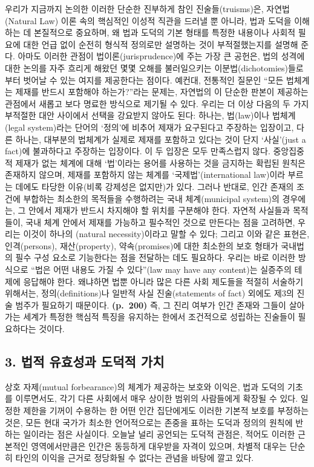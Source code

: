 우리가 지금까지 논의한 이러한 단순한 진부하게 참인 진술들(truisms)은,
자연법(Natural Law) 이론 속의 핵심적인 이성적 직관을 드러낼 뿐 아니라,
법과 도덕을 이해하는 데 본질적으로 중요하며, 왜 법과 도덕의 기본 형태를
특정한 내용이나 사회적 필요에 대한 언급 없이 순전히 형식적 정의로만
설명하는 것이 부적절했는지를 설명해 준다. 아마도 이러한 관점이
법이론(jurisprudence)에 주는 가장 큰 공헌은, 법의 성격에 대한 논의를
자주 흐리게 해왔던 몇몇 오해를 불러일으키는 이분법(dichotomies)들로부터
벗어날 수 있는 여지를 제공한다는 점이다. 예컨대, 전통적인 질문인 ``모든
법체계는 제재를 반드시 포함해야 하는가?''라는 문제는, 자연법의 이 단순한
판본이 제공하는 관점에서 새롭고 보다 명료한 방식으로 제기될 수 있다.
우리는 더 이상 다음의 두 가지 부적절한 대안 사이에서 선택을 강요받지
않아도 된다: 하나는, 법(law)이나 법체계(legal system)라는 단어의
`정의'에 비추어 제재가 요구된다고 주장하는 입장이고, 다른 하나는,
대부분의 법체계가 실제로 제재를 포함하고 있다는 것이 단지 `사실'(just a
fact)에 불과하다고 주장하는 입장이다. 이 두 입장은 모두 만족스럽지 않다.
중앙집중적 제재가 없는 체계에 대해 `법'이라는 용어를 사용하는 것을
금지하는 확립된 원칙은 존재하지 않으며, 제재를 포함하지 않는 체계를
`국제법'(international law)이라 부르는 데에도 타당한 이유(비록 강제성은
없지만)가 있다. 그러나 반대로, 인간 존재의 조건에 부합하는 최소한의
목적들을 수행하려는 국내 체계(municipal system)의 경우에는, 그 안에서
제재가 반드시 차지해야 할 위치를 구분해야 한다. 자연적 사실들과
목적들이, 국내 체계 안에서 제재를 가능하고 필수적인 것으로 만든다는 점을
고려하면, 우리는 이것이 하나의 (natural
necessity)이라고 말할 수 있다; 그리고 이와 같은 표현은, 인격(persons),
재산(property), 약속(promises)에 대한 최소한의 보호 형태가 국내법의 필수
구성 요소로 기능한다는 점을 전달하는 데도 필요하다. 우리는 바로 이러한
방식으로 ``법은 어떤 내용도 가질 수 있다''(law may have any content)는
실증주의 테제에 응답해야 한다. 왜냐하면 법뿐 아니라 많은 다른 사회
제도들을 적절히 서술하기 위해서는, 정의(definitions)나 일반적 사실
진술(statements of fact) 외에도 제3의 진술 범주가 필요하기 때문이다.
\textbf{(p.~200)} 즉, 그 진리 여부가 인간 존재와 그들이 살아가는 세계가
특정한 핵심적 특징을 유지하는 한에서 조건적으로 성립하는 진술들이
필요하다는 것이다.

\subsection{3. 법적 유효성과 도덕적
가치}\label{uxbc95uxc801-uxc720uxd6a8uxc131uxacfc-uxb3c4uxb355uxc801-uxac00uxce58}

상호 자제(mutual forbearance)의 체계가 제공하는 보호와 이익은, 법과
도덕의 기초를 이루면서도, 각기 다른 사회에서 매우 상이한 범위의
사람들에게 확장될 수 있다. 일정한 제한을 기꺼이 수용하는 한 어떤 인간
집단에게도 이러한 기본적 보호를 부정하는 것은, 모든 현대 국가가 최소한
언어적으로는 존중을 표하는 도덕과 정의의 원칙에 반하는 일이라는 점은
사실이다. 오늘날 널리 공언되는 도덕적 관점은, 적어도 이러한 근본적인
영역에서만큼은 인간은 동등하게 대우받을 자격이 있으며, 차별적 대우는
단순히 타인의 이익을 근거로 정당화될 수 없다는 관념을 바탕에 깔고 있다.

